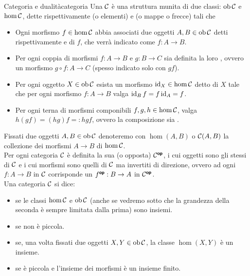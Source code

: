 \documentclass{article}
\renewcommand\C{\mc{C}}
\begin{document}
\begin{definition}{Categoria e dualità}{categoria}
    Una  $\C$ è una struttura munita di due classi: $\ob\C$ e $\hom\C$, dette rispettivamente  (o elementi) e  (o mappe o frecce) tali che \begin{itemize}
        \item Ogni morfismo $f \in \hom\C$ abbia associati due oggetti $A,B \in \ob\C$ detti rispettivamente  e  di $f$, che verrà indicato come $f : A\to B$.
        \item Per ogni coppia di morfismi $f:A\to B$ e $g : B\to C$ sia definita la loro , ovvero un morfismo $g\circ f : A \to C$ (spesso indicato solo con $gf$).
        \item Per ogni oggetto $X \in \ob\C$ esista un morfismo $\id_X \in \hom\C$ detto  di $X$ tale che per ogni morfismo $f:A\to B$ valga $\operatorname{id}_B f = f \operatorname{id}_A = f$.
        \item Per ogni terna di morfismi componibili $f,g,h \in \hom\C$, valga $h(gf) = (hg)f =: hgf$, ovvero la composizione sia .
    \end{itemize}
    Fissati due oggetti $A,B \in \ob\C$ denoteremo con $\hom(A,B)$ o $\C(A,B)$ la collezione dei morfismi $A\to B$ di $\hom\C$.\\
    Per ogni categoria $\C$ è definita la sua  (o opposta) $\C^\op$, i cui oggetti sono gli stessi di $\C$ e i cui morfismi sono quelli di $\C$ ma invertiti di direzione, ovvero ad ogni $f:A\to B$ in $\C$ corrisponde un $f^{\text{\sffamily\textbf{op}}} : B\to A$ in $\C^\op$.\\
    Una categoria $\C$ si dice:\begin{itemize}
        \item {} se le classi $\hom\C$ e $\ob\C$ (anche se vedremo sotto che la grandezza della seconda è sempre limitata dalla prima) sono insiemi.
        \item {} se non è piccola.
        \item {} se, una volta fissati due oggetti $X,Y \in \ob\C$, la classe $\hom(X,Y)$ è un insieme.
        \item {} se è piccola e l'insieme dei morfismi è un insieme finito.
    \end{itemize}
\end{definition}
\end{document}
